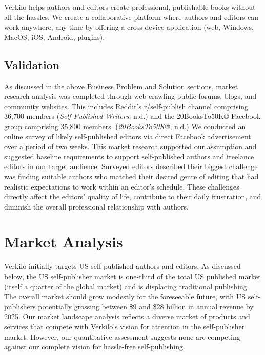 \documentclass[11pt,openany]{book}
\begin{document}
Verkilo helps authors and editors create professional, publishable books
without all the hassles. We create a collaborative platform where
authors and editors can work anywhere, any time by offering a
cross-device application (web, Windows, MacOS, iOS, Android, plugins).

\hypertarget{validation}{%
\section{Validation}\label{validation}}

As discussed in the above Business Problem and Solution sections, market
research analysis was completed through web crawling public forums,
blogs, and community websites. This includes Reddit's r/self-publish
channel comprising 36,700 members (\emph{Self Published Writers}, n.d.)
and the 20BooksTo50K® Facebook group comprising 35,800 members.
(\emph{20BooksTo50K®}, n.d.) We conducted an online survey of likely
self-published editors via direct Facebook advertisement over a period
of two weeks. This market research supported our assumption and
suggested baseline requirements to support self-published authors and
freelance editors in our target audience. Surveyed editors described
their biggest challenge was finding suitable authors who matched their
desired genre of editing that had realistic expectations to work within
an editor's schedule. These challenges directly affect the editors'
quality of life, contribute to their daily frustration, and diminish the
overall professional relationship with authors.

\hypertarget{market-analysis}{%
\chapter{Market Analysis}\label{market-analysis}}

Verkilo initially targets US self-published authors and editors. As
discussed below, the US self-publisher market is one-third of the total
US published market (itself a quarter of the global market) and is
displacing traditional publishing. The overall market should grow
modestly for the foreseeable future, with US self-publishers potentially
grossing between \$9 and \$28 billion in annual revenue by 2025. Our
market landscape analysis reflects a diverse market of products and
services that compete with Verkilo's vision for attention in the
self-publisher market. However, our quantitative assessment suggests
none are competing against our complete vision for hassle-free
self-publishing.
\end{document}
